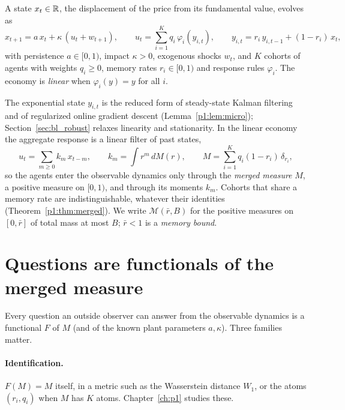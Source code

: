 \begin{definition}\label{def:cohort}
A state $x_t\in\mathbb{R}$, the displacement of the price from its fundamental value, evolves as
\begin{equation}\label{eq:fw_plant}
x_{t+1}=a\,x_t+\kappa\,(u_t+w_{t+1}),\qquad u_t=\sum_{i=1}^K q_i\,\varphi_i(y_{i,t}),\qquad y_{i,t}=r_i\,y_{i,t-1}+(1-r_i)\,x_t,
\end{equation}
with persistence $a\in[0,1)$, impact $\kappa>0$, exogenous shocks $w_t$, and $K$ cohorts of agents with weights $q_i\ge0$, memory rates $r_i\in[0,1)$ and response rules $\varphi_i$. The economy is \emph{linear} when $\varphi_i(y)=y$ for all $i$.
\end{definition}

The exponential state $y_{i,t}$ is the reduced form of steady-state Kalman filtering and of regularized online gradient descent (Lemma~\ref{p1:lem:micro}); Section~\ref{sec:bl_robust} relaxes linearity and stationarity. In the linear economy the aggregate response is a linear filter of past states,
\[
u_t=\sum_{m\ge0}k_m\,x_{t-m},\qquad k_m=\int r^m\,dM(r),\qquad M=\sum_{i=1}^K q_i(1-r_i)\,\delta_{r_i},
\]
so the agents enter the observable dynamics only through the \emph{merged measure} $M$, a positive measure on $[0,1)$, and through its moments $k_m$. Cohorts that share a memory rate are indistinguishable, whatever their identities (Theorem~\ref{p1:thm:merged}). We write $\mathcal M(\bar r,B)$ for the positive measures on $[0,\bar r]$ of total mass at most $B$; $\bar r<1$ is a \emph{memory bound}.

\section{Questions are functionals of the merged measure}\label{sec:fw_questions}

Every question an outside observer can answer from the observable dynamics is a functional $F$ of $M$ (and of the known plant parameters $a,\kappa$). Three families matter.

\paragraph{Identification.} $F(M)=M$ itself, in a metric such as the Wasserstein distance $W_1$, or the atoms $(r_i,q_i)$ when $M$ has $K$ atoms. Chapter~\ref{ch:p1} studies these.

